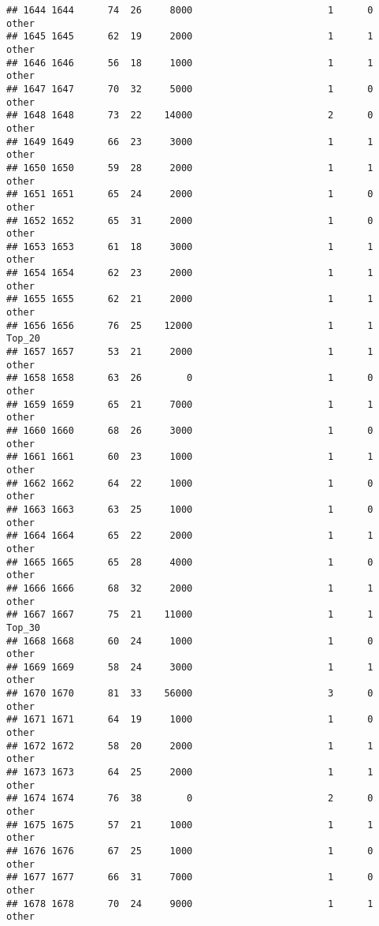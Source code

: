 \documentclass[
]{article}
\begin{document}
\begin{verbatim}
## 1644 1644      74  26     8000                        1      0    other
## 1645 1645      62  19     2000                        1      1    other
## 1646 1646      56  18     1000                        1      1    other
## 1647 1647      70  32     5000                        1      0    other
## 1648 1648      73  22    14000                        2      0    other
## 1649 1649      66  23     3000                        1      1    other
## 1650 1650      59  28     2000                        1      1    other
## 1651 1651      65  24     2000                        1      0    other
## 1652 1652      65  31     2000                        1      0    other
## 1653 1653      61  18     3000                        1      1    other
## 1654 1654      62  23     2000                        1      1    other
## 1655 1655      62  21     2000                        1      1    other
## 1656 1656      76  25    12000                        1      1   Top_20
## 1657 1657      53  21     2000                        1      1    other
## 1658 1658      63  26        0                        1      0    other
## 1659 1659      65  21     7000                        1      1    other
## 1660 1660      68  26     3000                        1      0    other
## 1661 1661      60  23     1000                        1      1    other
## 1662 1662      64  22     1000                        1      0    other
## 1663 1663      63  25     1000                        1      0    other
## 1664 1664      65  22     2000                        1      1    other
## 1665 1665      65  28     4000                        1      0    other
## 1666 1666      68  32     2000                        1      1    other
## 1667 1667      75  21    11000                        1      1   Top_30
## 1668 1668      60  24     1000                        1      0    other
## 1669 1669      58  24     3000                        1      1    other
## 1670 1670      81  33    56000                        3      0    other
## 1671 1671      64  19     1000                        1      0    other
## 1672 1672      58  20     2000                        1      1    other
## 1673 1673      64  25     2000                        1      1    other
## 1674 1674      76  38        0                        2      0    other
## 1675 1675      57  21     1000                        1      1    other
## 1676 1676      67  25     1000                        1      0    other
## 1677 1677      66  31     7000                        1      0    other
## 1678 1678      70  24     9000                        1      1    other

\end{verbatim}
\end{document}
